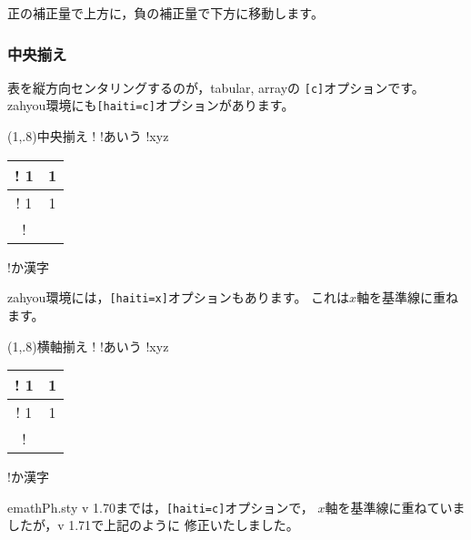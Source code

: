 正の補正量で上方に，負の補正量で下方に移動します。

\subsubsection{中央揃え}
表を縦方向センタリングするのが，\textsf{tabular, array}の
\verb+[c]+オプションです。\\
\textsf{zahyou}環境にも\verb+[haiti=c]+オプションがあります。

\begin{showpEx}(1,.8){中央揃え}
!\kizyunsen
!あいう%
%
!xyz%
\begin{tabular}[c]{|c|c|}\hline
!  1 & 1 \\\hline
!  1 & 1 \\\hline
!\end{tabular}%
!か漢字%
\end{showpEx}

\textsf{zahyou}環境には，\verb+[haiti=x]+オプションもあります。
これは$x$軸を基準線に重ねます。


\begin{showpEx}(1,.8){横軸揃え}
!\kizyunsen
!あいう%
%
!xyz%
\begin{tabular}[c]{|c|c|}\hline
!  1 & 1 \\\hline
!  1 & 1 \\\hline
!\end{tabular}%
!か漢字%
\end{showpEx}

\textsf{emathPh.sty v 1.70}までは，\verb+[haiti=c]+オプションで，
$x$軸を基準線に重ねていましたが，\textsf{v 1.71}で上記のように
修正いたしました。
\egroup

